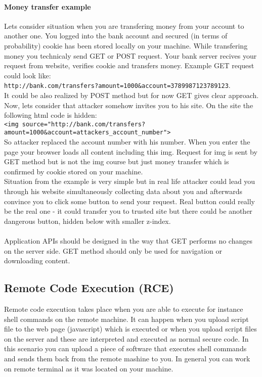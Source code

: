 \documentclass{article}[12pt]
\begin{document}
\paragraph{Money transfer example} Lets consider situation when you are transfering money from your account to another one.
You logged into the bank account and secured (in terms of probability) cookie has been stored locally on your machine.
While transfering money you technicaly send GET or POST request.
Your bank server recives your request from website, verifies cookie and transfers money.
Example GET request could look like: \\
\texttt{http://bank.com/transfers?amount=1000\&account=3789987123789123}. \\
It could be also realized by POST method but for now GET gives clear approach.
Now, lets consider that attacker somehow invites you to his site.
On the site the following html code is hidden: \\
\texttt{<img source="http://bank.com/transfers?amount=1000\&account=attackers\_account\_number">}\\
So attacker replaced the account number with his number.
When you enter the page your browser loads all content including this img.
Request for img is sent by GET method but is not the img course but just money transfer which is confirmed by cookie stored on your machine.\\

Situation from the example is very simple but in real life attacker could lead you through his website simultaneously collecting data about you and afterwards convince you to click some button to send your request.
Real button could really be the real one - it could transfer you to trusted site but there could be another dangerous button, hidden below with smaller z-index. \\\\
Application APIs should be designed in the way that GET performs no changes on the server side.
GET method should only be used for navigation or downloading content.


\subsection{Remote Code Execution (RCE)}
Remote code execution takes place when you are able to execute for instance shell commands on the remote machine.
It can happen when you upload script file to the web page (javascript) which is executed or when you
upload script files on the server and these are interpreted and executed as normal secure code.
In this scenario you can upload a piece of software that executes shell commands and sends them back from the remote mashine to you.
In general you can work on remote terminal as it was located on your machine.
\end{document}
